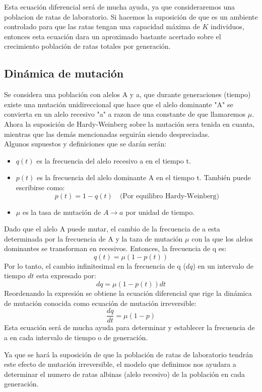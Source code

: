 \documentclass[12pt]{article}
\begin{document}
Esta ecuación diferencial será de mucha ayuda, ya que consideraremos una poblacion de ratas de laboratorio. Si hacemos la suposición de que es un ambiente controlado para que las ratas tengan una capacidad máxima de \(K\) individuos, entonces esta ecuación dara un aproximado bastante acertado sobre el crecimiento población de ratas totales por generación.
\subsection*{Dinámica de mutación}
Se considera una población con alelos A y a, que durante generaciones (tiempo) existe una mutación unidireccional que hace que el alelo dominante "A" se convierta en un alelo recesivo "a" a razon de una constante de  que llamaremos $\mu$. Ahora la suposición de Hardy-Weinberg sobre la mutación sera tenida en cuanta, mientras que las demás mencionadas seguirán siendo despreciadas.\\
Algunos supuestos y definiciones que se darán serán:
\begin{itemize}
    \item \(q(t)\) es la frecuencia del alelo recesivo a en el tiempo t.
    \item \(p(t)\) es la frecuencia del alelo dominante A en el tiempo t. También puede escribirse como:
    \[
    p(t) = 1 - q(t) \quad    \text{(Por equilibro Hardy-Weinberg)}
    \]
    \item \(\mu\) es la tasa de mutación de \(A \to a\) por unidad de tiempo.
\end{itemize}
Dado que el alelo A puede mutar, el cambio de la frecuencia de a esta determinada por la frecuencia de A y la taza de mutación \(\mu\) con la que los alelos dominantes se transforman en recesivos. Entonces, la frecuencia de q es:
\[
q(t) = \mu (1-p(t))
\]
Por lo tanto, el cambio infinitesimal en la frecuencia de q (\(dq\)) en un intervalo de tiempo \(dt\) esta expresado por:
\[
dq = \mu (1 - p(t))dt
\]
Reordenando la expresión se obtiene la ecuación diferencial que rige la dinámica de mutación conocida como ecuación de mutación irreversible:
\[
\frac{dq}{dt} = \mu(1 - p)
\]
Esta ecuación será de mucha ayuda para determinar y establecer la frecuencia de a en cada intervalo de tiempo o de generación.


Ya que se hará la suposición de que la población de ratas de laboratorio tendrán  este efecto de mutación irreversible, el modelo que definimos nos ayudara a determinar el numero de ratas albinas (alelo recesivo) de la población en cada generación.
\end{document}
